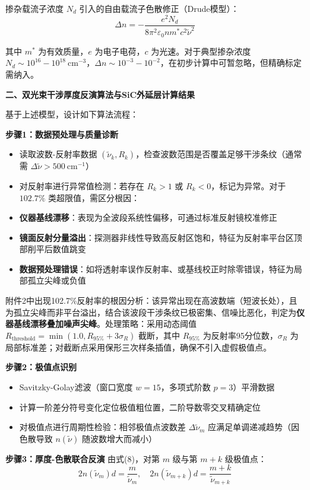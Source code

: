 \documentclass{mcmthesis}
\begin{document}
掺杂载流子浓度 $N_d$ 引入的自由载流子色散修正（Drude模型）：
$$\Delta n = -\frac{e^2N_d}{8\pi^2\varepsilon_0 n m^* c^2 \tilde{\nu}^2} \tag{16}$$

其中 $m^*$ 为有效质量，$e$ 为电子电荷，$c$ 为光速。对于典型掺杂浓度 $N_d \sim 10^{16}-10^{18}\ \text{cm}^{-3}$，$\Delta n \sim 10^{-3}-10^{-2}$，在初步计算中可暂忽略，但精确标定需纳入。

\textbf{二、双光束干涉厚度反演算法与SiC外延层计算结果}

基于上述模型，设计如下算法流程：

\textbf{步骤1：数据预处理与质量诊断}
\begin{itemize}
    \item 读取波数-反射率数据 $(\tilde{\nu}_k, R_k)$，检查波数范围是否覆盖足够干涉条纹（通常需 $\Delta\tilde{\nu} > 500\ \text{cm}^{-1}$）
    \item 对反射率进行异常值检测：若存在 $R_k > 1$ 或 $R_k < 0$，标记为异常。对于 $102.7\%$ 类超限值，需区分根因：
    \item \textbf{仪器基线漂移}：表现为全波段系统性偏移，可通过标准反射镜校准修正
    \item \textbf{镜面反射分量溢出}：探测器非线性导致高反射区饱和，特征为反射率平台区顶部削平后数值跳变
    \item \textbf{数据预处理错误}：如将透射率误作反射率、或基线校正时除零错误，特征为局部孤立尖峰或负值
\end{itemize}

  附件2中出现102.7\%反射率的根因分析：该异常出现在高波数端（短波长处），且为孤立尖峰而非平台溢出，结合该波段干涉条纹已极密集、信噪比恶化，判定为\textbf{仪器基线漂移叠加噪声尖峰}。处理策略：采用动态阈值 $R_{\text{threshold}} = \min(1.0, R_{95\%} + 3\sigma_R)$ 截断，其中 $R_{95\%}$ 为反射率95分位数，$\sigma_R$ 为局部标准差；对截断点采用保形三次样条插值，确保不引入虚假极值点。

\textbf{步骤2：极值点识别}
\begin{itemize}
    \item Savitzky-Golay滤波（窗口宽度 $w=15$，多项式阶数 $p=3$）平滑数据
    \item 计算一阶差分符号变化定位极值粗位置，二阶导数零交叉精确定位
    \item 对极值点进行周期性检验：相邻极值点波数差 $\Delta\tilde{\nu}_m$ 应满足单调递减趋势（因色散导致 $n(\tilde{\nu})$ 随波数增大而减小）
\end{itemize}

\textbf{步骤3：厚度-色散联合反演}
由式(8)，对第 $m$ 级与第 $m+k$ 级极值点：
$$2n(\tilde{\nu}_m)d = \frac{m}{\tilde{\nu}_m}, \quad 2n(\tilde{\nu}_{m+k})d = \frac{m+k}{\tilde{\nu}_{m+k}} \tag{17}$$
\end{document}
